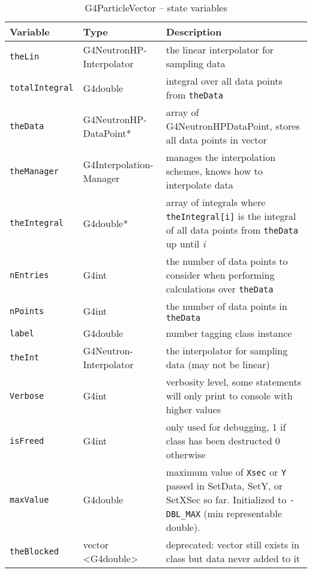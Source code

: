 \documentclass[12pt]{article}
\begin{document}
\begin{table}[h]
\caption{G4ParticleVector -- state variables}\label{Table_NeutronHPDataPointStateVariables}
\begin{tabularx}{\textwidth}{p{}p{}p{}}
\toprule
\bf Variable & \bf Type & \bf Description\\\midrule
\arrayrulecolor{lightgray}
\texttt{theLin} & G4NeutronHP-Interpolator & the linear interpolator for sampling data\\\hline
\texttt{totalIntegral} & G4double & integral over all data points from \texttt{theData}\\\hline
\texttt{theData} & G4NeutronHP-DataPoint* & array of G4NeutronHPDataPoint, stores all data points in vector\\\hline
\texttt{theManager} & G4Interpolation-Manager & manages the interpolation schemes, knows how to interpolate data\\\hline
\texttt{theIntegral} & G4double* & array of integrals where \texttt{theIntegral[i]} is the integral of all data points from \texttt{theData} up until \emph{i}\\\hline
\texttt{nEntries} & G4int & the number of data points to consider when performing calculations over \texttt{theData}\\\hline
\texttt{nPoints} & G4int & the number of data points in \texttt{theData} \\\hline
\texttt{label} & G4double & number tagging class instance\\\hline
\texttt{theInt} & G4Neutron-Interpolator & the interpolator for sampling data (may not be linear)\\\hline
\texttt{Verbose} & G4int & verbosity level, some statements will only print to console with higher values \\\hline
\texttt{isFreed} & G4int & only used for debugging, 1 if class has been destructed 0 otherwise\\\hline
\texttt{maxValue} & G4double & maximum value of \texttt{Xsec} or \texttt{Y} passed in SetData, SetY, or SetXSec so far. Initialized to \texttt{-DBL\_MAX} (min representable double).\\\hline
\texttt{theBlocked} & vector \textless G4double\textgreater & deprecated: vector still exists in class but data never added to it\\\hline

\end{tabularx}
\end{table}
\end{document}
